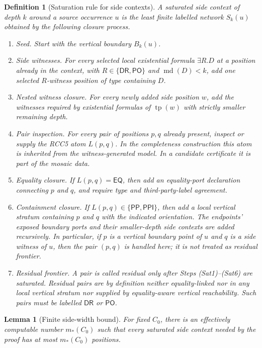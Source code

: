 \documentclass[11pt]{article}
\newtheorem{lemma}[theorem]{Lemma}
\newtheorem{definition}[theorem]{Definition}
\newcommand{\EQ}{\mathsf{EQ}}
\newcommand{\DR}{\mathsf{DR}}
\newcommand{\PO}{\mathsf{PO}}
\newcommand{\PP}{\mathsf{PP}}
\newcommand{\PPI}{\mathsf{PPI}}
\newcommand{\md}{\operatorname{md}}
\newcommand{\typ}{\operatorname{tp}}
\begin{document}
\begin{definition}[Saturation rule for side contexts]\label{def:saturated-side-context}
A saturated side context of depth $k$ around a source occurrence $u$ is the least finite labelled network $S_k(u)$ obtained by the following closure process.
\begin{enumerate}[label=(Sat\arabic*)]
\item \emph{Seed.}  Start with the vertical boundary $B_k(u)$.
\item \emph{Side witnesses.}  For every selected local existential formula $\exists R.D$ at a position already in the context, with $R\in\{\DR,\PO\}$ and $\md(D)<k$, add one selected $R$-witness position of type containing $D$.
\item \emph{Nested witness closure.}  For every newly added side position $w$, add the witnesses required by existential formulas of $\typ(w)$ with strictly smaller remaining depth.
\item \emph{Pair inspection.}  For every pair of positions $p,q$ already present, inspect or supply the RCC5 atom $L(p,q)$.  In the completeness construction this atom is inherited from the witness-generated model.  In a candidate certificate it is part of the mosaic data.
\item \emph{Equality closure.}  If $L(p,q)=\EQ$, then add an equality-port declaration connecting $p$ and $q$, and require type and third-party-label agreement.
\item \emph{Containment closure.}  If $L(p,q)\in\{\PP,\PPI\}$, then add a local vertical stratum containing $p$ and $q$ with the indicated orientation.  The endpoints' exposed boundary ports and their smaller-depth side contexts are added recursively.  In particular, if $p$ is a vertical boundary point of $u$ and $q$ is a side witness of $u$, then the pair $(p,q)$ is handled here; it is not treated as residual frontier.
\item \emph{Residual frontier.}  A pair is called residual only after Steps (Sat1)--(Sat6) are saturated.  Residual pairs are by definition neither equality-linked nor in any local vertical stratum nor supplied by equality-aware vertical reachability.  Such pairs must be labelled $\DR$ or $\PO$.
\end{enumerate}
\end{definition}

\begin{lemma}[Finite side-width bound]\label{lem:side-width}
For fixed $C_0$, there is an effectively computable number $m_*(C_0)$ such that every saturated side context needed by the proof has at most $m_*(C_0)$ positions.
\end{lemma}
\end{document}
